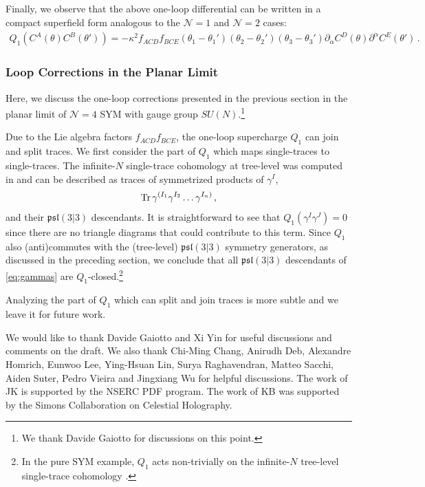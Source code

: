\documentclass[11pt]{article}
\begin{document}
Finally, we observe that the above one-loop differential can be written in a compact
superfield form analogous to the $\mathcal{N}=1$ and $\mathcal{N}=2$ cases:
\begin{align}
        Q_1 (C^A(\theta) C^B(\theta')) = -\kappa^2 f_{ACD}f_{BCE}  (\theta_1-\theta_1')(\theta_2-\theta_2')(\theta_3-\theta_3') \partial_{\dot\alpha} C^D(\theta) \partial^{\dot\alpha} C^E(\theta') \, . \label{eq:Q1N4}
\end{align}

\subsubsection{Loop Corrections in the Planar Limit}

Here, we discuss the one-loop corrections presented in the previous section in the planar limit of $\mathcal{N}=4$ SYM with gauge group $SU(N)$.\footnote{We thank Davide Gaiotto for discussions on this point.}

Due to the Lie algebra factors $f_{ACD}f_{BCE}$, the one-loop supercharge $Q_1$ can join and split traces. We first consider the part of $Q_1$ which maps single-traces to single-traces. The infinite-$N$ single-trace cohomology at tree-level was computed in \cite{Chang:2013fba} and can be described as traces of symmetrized products of $\gamma^I$,
\begin{align}
    \Tr \gamma^{(I_1} \gamma^{I_2} \dots \gamma^{I_n)} \, , \label{eq:gammas}
\end{align}
and their $\mathfrak{psl}(3|3)$ descendants. It is straightforward to see that $Q_1(\gamma^I\gamma^J)=0$ since there are no triangle diagrams that could contribute to this term. Since $Q_1$ also (anti)commutes with the (tree-level) $\mathfrak{psl}(3|3)$ symmetry generators, as discussed in the preceding section, we conclude that all $\mathfrak{psl}(3|3)$ descendants of \eqref{eq:gammas} are $Q_1$-closed.\footnote{In the pure SYM example, $Q_1$ acts non-trivially on the infinite-$N$ tree-level single-trace cohomology \cite{Budzik:2023xbr}.} 

Analyzing the part of $Q_1$ which can split and join traces is more subtle and we leave it for future work.


\acknowledgments
We would like to thank Davide Gaiotto and Xi Yin for useful discussions and comments on the draft. We also thank Chi-Ming Chang, Anirudh Deb, Alexandre Homrich, Eunwoo Lee, Ying-Hsuan Lin, Surya Raghavendran, Matteo Sacchi, Aiden Suter, Pedro Vieira and Jingxiang Wu for helpful discussions. The work of JK is supported by the NSERC PDF program. The work of KB was supported by the Simons Collaboration on Celestial Holography.
\end{document}
